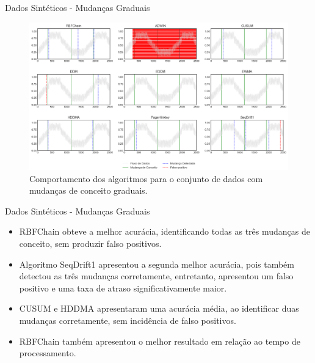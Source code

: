 \documentclass[10pt]{beamer}
\begin{document}
\begin{frame}{Dados Sintéticos -  Mudanças Graduais}
    \begin{figure}[t]
        \begin{center}
            \includegraphics[width=\textwidth]{imagens/gradual.png}
            \caption{Comportamento dos algoritmos para o conjunto de dados com mudanças de conceito graduais.}
            \label{fig:exp_gradual}
        \end{center}
    \end{figure}
\end{frame}

\begin{frame}{Dados Sintéticos -  Mudanças Graduais}
    \begin{itemize}
        \item RBFChain obteve a melhor acurácia, identificando todas as três mudanças de conceito, sem produzir falso positivos.
        \item Algoritmo SeqDrift1 apresentou a segunda melhor acurácia, pois também detectou as três mudanças corretamente, entretanto, apresentou um falso positivo e uma taxa de atraso significativamente maior.
        \item CUSUM e HDDMA apresentaram uma acurácia média, ao identificar duas mudanças corretamente, sem incidência de falso positivos.
        \item RBFChain também apresentou o melhor resultado em relação ao tempo de processamento.
    \end{itemize}
\end{frame}
\end{document}
